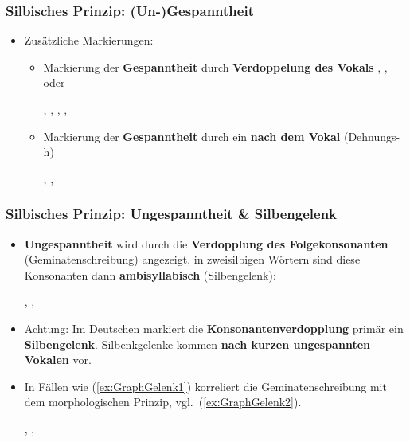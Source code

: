 \begin{frame}
\frametitle{Silbisches Prinzip: (Un-)Gespanntheit}

\begin{itemize}
	\item Zusätzliche Markierungen:

	\begin{itemize} 
		\item Markierung der \textbf{Gespanntheit} durch \textbf{Verdoppelung des Vokals} , ,  oder  
		
		\ea {}, , , , 
		\z

		\item Markierung der \textbf{Gespanntheit} durch ein  \textbf{nach dem Vokal} (Dehnungs-h) 
		
		\ea {}, , 
		\z
	\end{itemize}
\end{itemize}

\end{frame}


\begin{frame}
\frametitle{Silbisches Prinzip: Ungespanntheit \& Silbengelenk}

\begin{itemize}
	\item \textbf{Ungespanntheit} wird \ua durch die \textbf{Verdopplung des Folgekonsonanten} (Geminatenschreibung) angezeigt, in zweisilbigen Wörtern sind diese Konsonanten dann \textbf{ambisyllabisch} (\dash Silbengelenk): 


\ea {}, , 
\z

	\item Achtung: Im Deutschen markiert die \textbf{Konsonantenverdopplung} primär ein \textbf{Silbengelenk}. Silbenkgelenke kommen \textbf{nach kurzen ungespannten Vokalen} vor.
	
	\item In Fällen wie (\ref{ex:GraphGelenk1}) korreliert die Geminatenschreibung mit dem morphologischen Prinzip, vgl.\ (\ref{ex:GraphGelenk2}).

	\ea 
	\ea\label{ex:GraphGelenk1} , 
	\ex\label{ex:GraphGelenk2} , 
	\z
	\z 
\end{itemize}
\end{frame}


